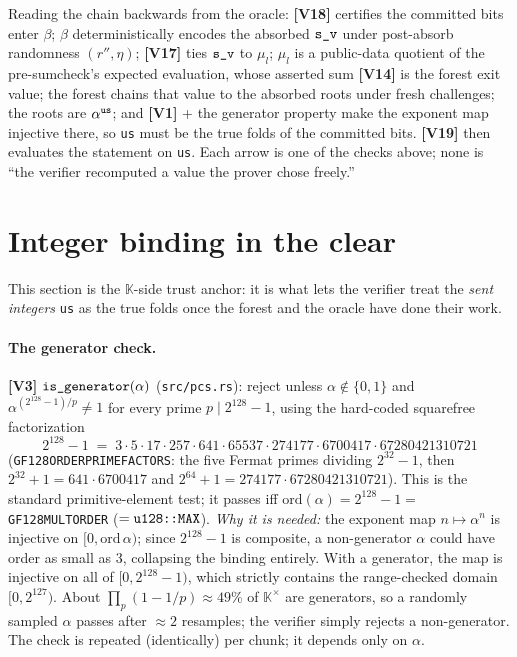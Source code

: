 \documentclass[11pt]{article}
\newcommand{\K}{\mathbb{K}}            %
\newcommand{\Kx}{\K^{\times}}
\newcommand{\code}[1]{{\def\_{\textunderscore\allowbreak}\texttt{#1}}}
\newcommand{\Vc}[1]{\textbf{[V#1]}}    %
\begin{document}
Reading the chain backwards from the oracle: \Vc{18} certifies the
committed bits enter $\beta$; $\beta$ deterministically encodes the
absorbed $\code{s\_v}$ under post-absorb randomness $(r'', \eta)$;
\Vc{17} ties $\code{s\_v}$ to $\mu_l$; $\mu_l$ is a public-data quotient
of the pre-sumcheck's expected evaluation, whose asserted sum \Vc{14} is
the forest exit value; the forest chains that value to the absorbed
roots under fresh challenges; the roots are $\alpha^{\code{us}}$; and
\Vc{1} + the generator property make the exponent map injective there, so
\code{us} must be the true folds of the committed bits.  \Vc{19} then
evaluates the statement on \code{us}.  Each arrow is one of the checks
above; none is ``the verifier recomputed a value the prover chose
freely.''

\section{Integer binding in the clear}
\label{sec:binding}

This section is the $\K$-side trust anchor: it is what lets the verifier
treat the \emph{sent integers} \code{us} as the true folds once the forest
and the oracle have done their work.

\paragraph{The generator check.}  \Vc{3}
$\code{is\_generator}(\alpha)$ (\code{src/pcs.rs}): reject unless
$\alpha \notin \{0, 1\}$ and
$\alpha^{(2^{128}-1)/p} \ne 1$ for every prime
$p \mid 2^{128}-1$, using the hard-coded squarefree factorization
\[
  2^{128}-1 \;=\; 3 \cdot 5 \cdot 17 \cdot 257 \cdot 641 \cdot 65537
  \cdot 274177 \cdot 6700417 \cdot 67280421310721
\]
(\code{GF128\_ORDER\_PRIME\_FACTORS}: the five Fermat primes dividing
$2^{32}-1$, then $2^{32}+1 = 641 \cdot 6700417$ and
$2^{64}+1 = 274177 \cdot 67280421310721$).  This is the standard
primitive-element test; it passes iff
$\mathrm{ord}(\alpha) = 2^{128}-1 = $ \code{GF128\_MULT\_ORDER}
($= \code{u128::MAX}$).  \emph{Why it is needed:} the exponent map
$n \mapsto \alpha^n$ is injective on $[0, \mathrm{ord}\,\alpha)$; since
$2^{128}-1$ is composite, a non-generator $\alpha$ could have order as
small as $3$, collapsing the binding entirely.  With a generator, the map
is injective on all of $[0, 2^{128}-1)$, which strictly contains the
range-checked domain $[0, 2^{127})$.  About $\prod_p (1 - 1/p) \approx
49\%$ of $\Kx$ are generators, so a randomly sampled $\alpha$ passes after
$\approx 2$ resamples; the verifier simply rejects a non-generator.  The
check is repeated (identically) per chunk; it depends only on $\alpha$.
\end{document}
